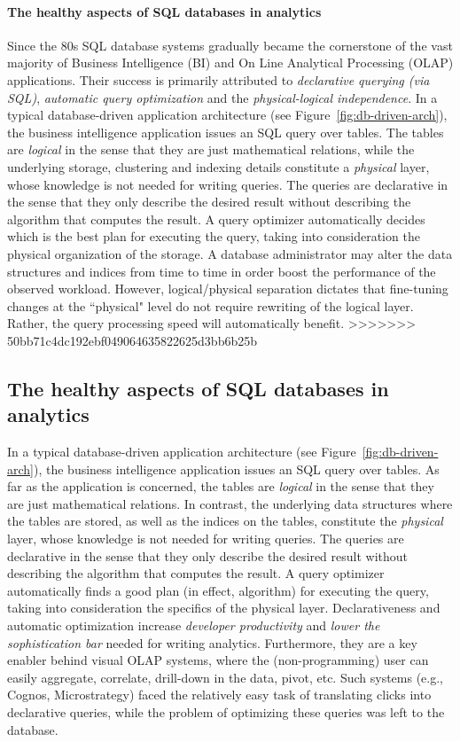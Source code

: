 \paragraph{The healthy aspects of SQL databases in analytics}
Since the 80s SQL database systems gradually became the cornerstone of
the vast majority of Business Intelligence (BI) and On Line Analytical
Processing (OLAP) applications. 
Their success is primarily attributed to {\em declarative querying
(via SQL)}, {\em automatic query optimization} and the {\em
physical-logical independence}. In a typical database-driven
application architecture (see Figure~\ref{fig:db-driven-arch}), the
business intelligence application issues an SQL query over tables. The
tables are {\em logical} in the sense that they are just mathematical
relations, while the underlying storage, clustering and indexing
details constitute a {\em physical} layer, whose knowledge is not
needed for writing queries. The queries are declarative in the sense
that they only describe the desired result without describing the
algorithm that computes the result. A query optimizer automatically
decides which is the best plan for executing the query, taking into
consideration the physical organization of the storage. A database
administrator may alter the data structures and indices from time to
time in order boost the performance of the observed workload. However,
logical/physical separation dictates that fine-tuning changes at the ``physical" level do not require rewriting of the logical layer. Rather, the query processing speed will automatically benefit.
>>>>>>> 50bb71c4dc192ebf049064635822625d3bb6b25b


\subsection{The healthy aspects of SQL databases in analytics}
\label{sec:healthy-aspects}
In a typical database-driven application architecture (see Figure~\ref{fig:db-driven-arch}), the business intelligence application issues an SQL query over tables. As far as the application is concerned, the tables are {\em logical} in the sense that they are just mathematical relations. In contrast, the underlying data structures where the tables are stored, as well as the indices on the tables, constitute the {\em physical} layer, whose knowledge is not needed for writing queries. The queries are declarative in the sense that they only describe the desired result without describing the algorithm that computes the result. A query optimizer automatically finds a good plan (in effect, algorithm) for executing the query, taking into consideration the specifics of the physical layer. Declarativeness and automatic optimization increase {\em developer productivity} and {\em lower the sophistication bar} needed for writing analytics. Furthermore, they are a key enabler behind visual OLAP systems, where the (non-programming) user can easily aggregate, correlate, drill-down in the data, pivot, etc. Such systems (e.g., Cognos, Microstrategy) faced the relatively easy task of translating clicks into declarative queries, while the problem of optimizing these queries was left to the database.


